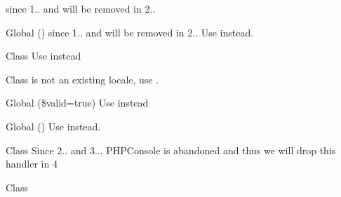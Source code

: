 \begin{DoxyRefList}
%
since 1.. and will be removed in 2..  
\item[Global \doxylink{class_mockery_1_1_generator_1_1_parameter_a079a959fb82132d2f41ea081c0abbb00}{Parameter\+::get\+Type\+Hint\+As\+String} ()]\label{deprecated__deprecated000086}%
%
since 1.. and will be removed in 2.. Use  instead.  
\item[Class \doxylink{class_faker_1_1_provider_1_1zh___t_w_1_1_payment}{Payment} ]\label{deprecated__deprecated000025}%
%
Use {\ttfamily {}} instead  
\item[Class \doxylink{class_faker_1_1_provider_1_1at___a_t_1_1_payment}{Payment} ]\label{deprecated__deprecated000015}%
%
 is not an existing locale, use {\ttfamily {}}.  
\item[Global \doxylink{class_faker_1_1_provider_1_1zh___t_w_1_1_payment_a035f137f9657a0927746ed162f1aa6ce}{Payment\+::credit\+Card\+Details} (\$valid=true)]\label{deprecated__deprecated000026}%
%
Use {\ttfamily \doxylink{}{()}} instead  
\item[Global \doxylink{class_faker_1_1_provider_1_1el___g_r_1_1_phone_number_a28d49b7c546146643d9ece2c4a458bfb}{Phone\+Number\+::mobile\+Phone\+Number} ()]\label{deprecated__deprecated000018}%
%
Use  instead.  
\item[Class \doxylink{class_monolog_1_1_handler_1_1_p_h_p_console_handler}{PHPConsole\+Handler} ]\label{deprecated__deprecated000094}%
%
Since 2.. and 3.., PHPConsole is abandoned and thus we will drop this handler in  4  
\item[Class \doxylink{class_symfony_1_1_component_1_1_translation_1_1_extractor_1_1_php_extractor}{Php\+Extractor} ]\label{deprecated__deprecated000351}%
%

\end{DoxyRefList}
